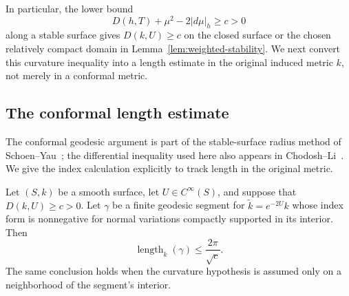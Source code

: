 In particular, the lower bound
\begin{equation}\label{eq:pressure-curvature-condition}
 D(h,T)+\mu^2-2|d\mu|_h\ge c>0
\end{equation}
along a stable surface gives $D(k,U)\ge c$ on the closed surface or
the chosen relatively compact domain in Lemma~\ref{lem:weighted-stability}.
We next convert this curvature inequality into a length estimate in the
original induced metric $k$, not merely in a conformal metric.

\subsection{The conformal length estimate}

The conformal geodesic argument is part of the stable-surface radius
method of Schoen--Yau~\cite{SchoenYau1983}; the differential inequality
used here also appears in Chodosh--Li~\cite[Lemma~16]{ChodoshLi2024}.
We give the index calculation explicitly to track length in the original
metric.

\begin{lemma}\label{lem:conformal-length}
Let $(S,k)$ be a smooth surface, let $U\in C^\infty(S)$, and suppose
that $D(k,U)\ge c>0$.  Let $\gamma$ be a finite geodesic segment for
$\widetilde k=e^{-2U}k$ whose index form is nonnegative for normal
variations compactly supported in its interior.  Then
\[
 \operatorname{length}_k(\gamma)\le\frac{2\pi}{\sqrt c}.
\]
The same conclusion holds when the curvature hypothesis is assumed only
on a neighborhood of the segment's interior.
\end{lemma}

